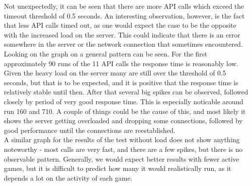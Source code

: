 Not unexpectedly, it can be seen that there are more API calls which exceed the timeout threshold of 0.5 seconds. An interesting observation, however, is the fact that less API calls timed out, as one would expect the case to be the opposite with the increased load on the server. This could indicate that there is an error somewhere in the server or the network connection that sometimes encountered.\\

Looking on the graph on  a general pattern can be seen. For the first approximately 90 runs of the 11 API calls the response time is reasonably low. Given the heavy load on the server many are still over the threshold of 0.5 seconds, but that is to be expected, and it is positive that the response time is relatively stable until then. After that several big spikes can be observed, followed closely by period of very good response time. This is especially noticable around run 160 and 710. A couple of things could be the cause of this, and most likely it shows the server getting overloaded and dropping some connections, followed by good performance until the connections are reestablished.\\

A similar graph for the results of the test without load does not show anything noteworthy - most calls are very fast, and there are a few spikes, but there is no observable pattern. Generally, we would expect better results with fewer active games, but it is difficult to predict how many it would realistically run, as it depends a lot on the activity of each game.\\\\

